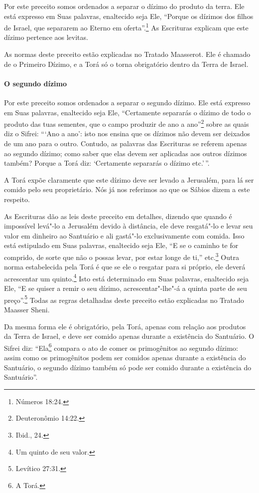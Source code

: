 \begin{multicols}{2}
Por este preceito somos ordenados a separar o dízimo do produto da
terra. Ele está expresso em Suas palavras, enaltecido seja Ele, ``Porque
os dízimos dos filhos de Israel, que separarem ao Eterno em oferta''.\footnote{Números 18:24.} As Escrituras explicam que este dízimo pertence aos
levitas\starr.

As normas deste preceito estão explicadas no Tratado Maasserot\starr. Ele é
chamado de o Primeiro Dízimo, e a Torá\starr{} só o torna obrigatório dentro da
Terra de Israel.

\paragraph{O segundo dízimo}

Por este preceito somos ordenados a separar o segundo dízimo. Ele está
expresso em Suas palavras, enaltecido seja Ele, ``Certamente separarás o
dízimo de todo o produto das tuas sementes, que o campo produzir de ano
a ano''\footnote{Deuteronômio 14:22.} sobre as quais diz o Sifrei\starr: ```Ano a ano':
isto nos ensina que os dízimos não devem ser deixados de um ano para o
outro. Contudo, as palavras das Escrituras se referem apenas ao segundo
dízimo; como saber que elas devem ser aplicadas aos outros dízimos
também? Porque a Torá\starr{} diz: `Certamente separarás o dízimo etc.'\,''.

A Torá\starr{} expõe claramente que este dízimo deve ser levado a Jerusalém,
para lá ser comido pelo seu proprietário. Nós já nos referimos ao que os
Sábios dizem a este respeito.

As Escrituras dão as leis deste preceito em detalhes, dizendo que quando
é impossível levá"-lo a Jerusalém devido à distância, ele deve resgatá"-lo
e levar seu valor em dinheiro ao Santuário e ali gastá"-lo
exclusivamente com comida. Isso está estipulado em Suas palavras,
enaltecido seja Ele, ``E se o caminho te for comprido, de sorte que não o possas levar, por estar longe de ti,'' etc.\footnote{Ibid., 24.} Outra norma estabelecida pela Torá\starr{} é que se ele o resgatar para si próprio, ele deverá acrescentar um
quinto.\footnote{Um quinto de seu valor.} Isto está determinado em Suas palavras,
enaltecido seja Ele, ``E se quiser a remir o seu dízimo, acrescentar"-lhe"-á a quinta parte de seu preço''.\footnote{Levítico 27:31.}
Todas as regras detalhadas deste preceito estão explicadas no Tratado Maasser
Sheni\starr.

Da mesma forma ele é obrigatório, pela Torá\starr, apenas com relação aos
produtos da Terra de Israel, e deve ser comido apenas durante a
existência do Santuário. O Sifrei\starr{} diz: ``Ela\footnote{A Torá\starr.}
compara o ato de comer os primogênitos ao segundo dízimo: assim como os
primogênitos podem ser comidos apenas durante a existência do
Santuário, o segundo dízimo também só pode ser comido durante a
existência do Santuário''.


\end{multicols}
